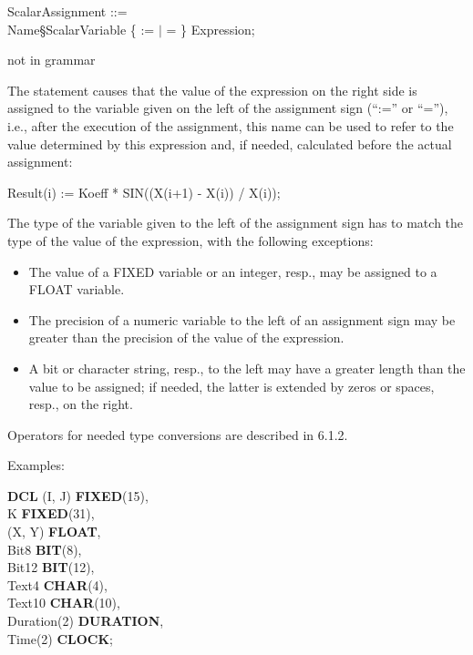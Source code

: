 \begin{front}
ScalarAssignment ::=\\
\x Name\S ScalarVariable \{ := $\mid$ = \} Expression;
\end{front}
\begin{grammar}
not in grammar
\end{grammar}

The statement causes that the value of the expression on the right side
is assigned to the variable given on the left of the assignment sign
(``:='' or ``=''), i.e., after the execution of the assignment, this
name can be used to refer to the value determined by this expression
and, if needed, calculated before the actual assignment:

Result(i) := Koeff * SIN((X(i+1) - X(i)) / X(i));

The type of the variable given to the left of the assignment sign has to
match the type of the value of the expression, with the following
exceptions:
\begin{itemize}
\item The value of a FIXED variable or an integer, resp., may be
assigned to a FLOAT variable.
\item The precision of a numeric variable to the left of an assignment
sign may be greater than the precision of the value of the expression.
\item A bit or character string, resp., to the left may have a greater
length than the value to be assigned; if needed, the latter is extended
by zeros or spaces, resp., on the right.
\end{itemize}

Operators for needed type conversions are described in 6.1.2.

Examples:

{\bf DCL} (I, J) {\bf FIXED}(15),\\
\x K {\bf FIXED}(31),\\
\x (X, Y) {\bf FLOAT},\\
\x Bit8 {\bf BIT}(8),\\
\x Bit12 {\bf BIT}(12),\\
\x Text4 {\bf CHAR}(4),\\
\x Text10 {\bf CHAR}(10),\\
\x Duration(2) {\bf DURATION},\\
\x Time(2) {\bf CLOCK};

